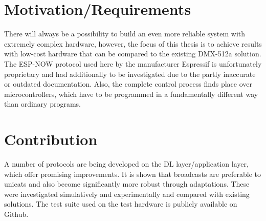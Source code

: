\section*{Motivation/Requirements}

There will always be a possibility to build an even more reliable system with extremely complex hardware,
however, the focus of this thesis is to achieve results with low-cost hardware that can be compared 
to the existing DMX-512a solution.
The ESP-NOW protocol used here by the manufacturer Espressif is unfortunately proprietary
and had additionally to be investigated due to the partly inaccurate or outdated documentation.
Also, the complete control process finds place over microcontrollers, 
which have to be programmed in a fundamentally different way than ordinary programs.

\section*{Contribution}

A number of protocols are being developed on the DL layer/application layer,
which offer promising improvements.
It is shown that broadcasts are preferable to unicats
and also become significantly more robust through adaptations.
These were investigated simulatively and experimentally and compared with existing solutions.
The test suite used on the test hardware is publicly available on Github.

